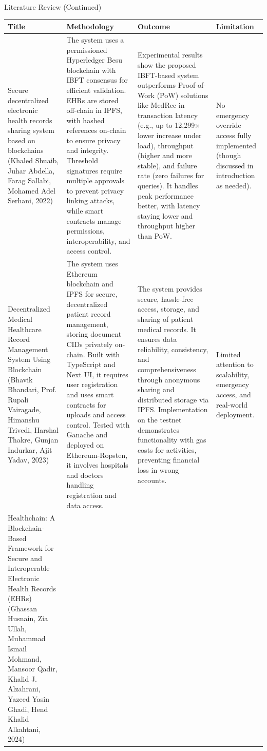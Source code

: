 \documentclass[10pt]{beamer}
\begin{document}
\begin{frame}{Literature Review (Continued)}
\tiny
\begin{adjustbox}{width=\textwidth,center}
\begin{tabular}{p{3cm}p{3cm}p{3cm}p{3cm}}
\toprule
\textbf{Title} & \textbf{Methodology} & \textbf{Outcome} & \textbf{Limitation} \\
\midrule
Secure decentralized electronic health records sharing system based on blockchains (Khaled Shuaib, Juhar Abdella, Farag Sallabi, Mohamed Adel Serhani, 2022) & 
The system uses a permissioned Hyperledger Besu blockchain with IBFT consensus for efficient validation. EHRs are stored off-chain in IPFS, with hashed references on-chain to ensure privacy and integrity. Threshold signatures require multiple approvals to prevent privacy linking attacks, while smart contracts manage permissions, interoperability, and access control. & 
Experimental results show the proposed IBFT-based system outperforms Proof-of-Work (PoW) solutions like MedRec in transaction latency (e.g., up to 12,299× lower increase under load), throughput (higher and more stable), and failure rate (zero failures for queries). It handles peak performance better, with latency staying lower and throughput higher than PoW. & 
No emergency override access fully implemented (though discussed in introduction as needed). \\
\midrule
Decentralized Medical Healthcare Record Management System Using Blockchain (Bhavik Bhandari, Prof. Rupali Vairagade, Himanshu Trivedi, Harshal Thakre, Gunjan Indurkar, Ajit Yadav, 2023) & 
The system uses Ethereum blockchain and IPFS for secure, decentralized patient record management, storing document CIDs privately on-chain. Built with TypeScript and Next UI, it requires user registration and uses smart contracts for uploads and access control. Tested with Ganache and deployed on Ethereum-Ropsten, it involves hospitals and doctors handling registration and data access. & 
The system provides secure, hassle-free access, storage, and sharing of patient medical records. It ensures data reliability, consistency, and comprehensiveness through anonymous sharing and distributed storage via IPFS. Implementation on the testnet demonstrates functionality with gas costs for activities, preventing financial loss in wrong accounts. & 
Limited attention to scalability, emergency access, and real-world deployment. \\
\midrule
Healthchain: A Blockchain-Based Framework for Secure and Interoperable Electronic Health Records (EHRs)(Ghassan Husnain, Zia Ullah, Muhammad Ismail Mohmand, Mansoor Qadir, Khalid J. Alzahrani, Yazeed Yasin Ghadi, Hend Khalid Alkahtani, 2024) & 

\end{tabular}
\end{adjustbox}
\end{frame}
\end{document}
